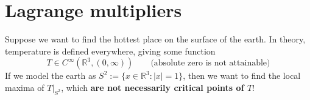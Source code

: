 
\section{Lagrange multipliers}
\label{sec:lagrange_multipliers}

Suppose we want to find the hottest place on the surface of the earth. In theory, temperature is
defined everywhere, giving some function
\[T \in C^\infty(\mathbb{R}^3, (0,\infty)) \qquad \text{(absolute zero is not attainable)}\]
If we model the earth as $S^2 := \{x \in \mathbb{R}^3 : |x| = 1\}$, then we want to find the local
maxima of $T|_{S^2}$, which \textbf{are not necessarily critical points of $T$}!

